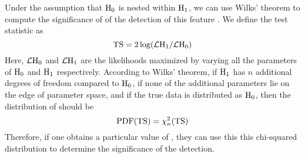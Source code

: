 Under the assumption that $\text{H}_0$ is nested
within $\text{H}_1$, we can use Wilks' theorem to
compute the significance of of the detection of this feature
\citep{wilks_1938a_large-sample-distribution}.  We define the test
statistic as
\begin{equation}
  \mathrm{TS} = 2\log(\mathcal{L}\text{H}_1/\mathcal{L}\text{H}_0)
\end{equation}
Here, $\mathcal{L}\text{H}_0$ and $\mathcal{L}\text{H}_1$ are the
likelihoods maximized by varying all the parameters of $\text{H}_0$
and $\text{H}_1$ respectively.  According to Wilks' theorem,
if $\text{H}_1$ has $n$ additional degrees of freedom compared to
$\text{H}_0$, if none of the additional parameters lie on the edge of
parameter space, and if the true data is distributed as $\text{H}_0$,
then the distribution of \ts should be
\begin{equation}
  \text{PDF}(\mathrm{TS}) = \chi^2_n(\mathrm{TS})
\end{equation}
Therefore, if one obtains a particular value of \ts, they can use
this this chi-squared distribution to determine the significance of
the detection.
